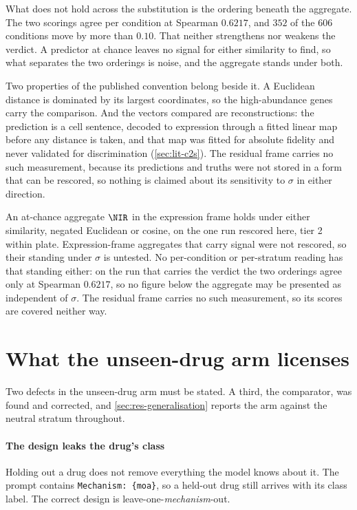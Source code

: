 What does not hold across the substitution is the ordering beneath the
aggregate. The two scorings agree per condition at Spearman $0.6217$, and $352$
of the $606$ conditions move by more than $0.10$. That neither strengthens nor
weakens the verdict. A predictor at chance leaves no signal for either
similarity to find, so what separates the two orderings is noise, and the
aggregate stands under both.

Two properties of the published convention belong beside it. A Euclidean
distance is dominated by its largest coordinates, so the high-abundance genes
carry the comparison. And the vectors compared are reconstructions: the
prediction is a cell sentence, decoded to expression through a fitted linear map
before any distance is taken, and that map was fitted for absolute fidelity and
never validated for discrimination (\cref{sec:lit-c2s}). The residual frame
carries no such measurement, because its predictions and truths were not stored
in a form that can be rescored, so nothing is claimed about its sensitivity to
$\sigma$ in either direction.

\begin{scopelimit}
An at-chance aggregate $\NIR$ in the expression frame holds under either
similarity, negated Euclidean or cosine, on the one run rescored here, tier 2
within plate. Expression-frame aggregates that carry signal were not rescored,
so their standing under $\sigma$ is untested. No per-condition or per-stratum
reading has that standing either: on the run that carries the verdict the two
orderings agree only at Spearman $0.6217$, so no figure below the aggregate may
be presented as independent of $\sigma$. The residual frame carries no such
measurement, so its scores are covered neither way.
\end{scopelimit}

\section{What the unseen-drug arm licenses}
\label{sec:lim-unseen}

Two defects in the unseen-drug arm must be stated. A third, the comparator, was
found and corrected, and \cref{sec:res-generalisation} reports the arm against
the neutral stratum throughout.

\paragraph{The design leaks the drug's class} Holding out a drug does not
remove everything the model knows about it. The prompt contains
\texttt{Mechanism: \{moa\}}, so a held-out drug still arrives with its class
label. The correct design is leave-one-\emph{mechanism}-out.


